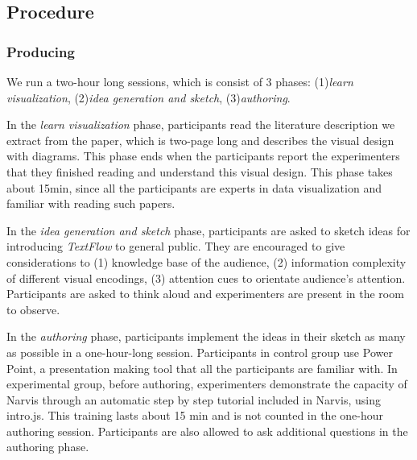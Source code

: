 \documentclass[review,journal]{vgtc}         %
\begin{document}
\subsection{Procedure}
\subsubsection{Producing}
We run a two-hour long sessions, which is consist of 3 phases: (1)\textit{learn visualization}, (2)\textit{idea generation and sketch}, (3)\textit{authoring}.\par
In the \textit{learn visualization} phase, participants read the literature description we extract from the paper, which is two-page long and describes the visual design with diagrams. This phase ends when the participants report the experimenters that they finished reading and understand this visual design. This phase takes about 15min, since all the participants are experts in data visualization and familiar with reading such papers.\par
In the \textit{idea generation and sketch} phase, participants are asked to sketch ideas for introducing \textit{TextFlow} to general public. They are encouraged to give considerations to (1) knowledge base of the audience, (2) information complexity of different visual encodings, (3) attention cues to orientate audience's attention. Participants are asked to think aloud and experimenters are present in the room to observe. \par
In the \textit{authoring} phase, participants implement the ideas in their sketch as many as possible in a one-hour-long session. Participants in control group use Power Point, a presentation making tool that all the participants are familiar with. In experimental group, before authoring, experimenters demonstrate the capacity of Narvis through an automatic step by step tutorial included in Narvis, using intro.js. This training lasts about 15 min and is not counted in the one-hour authoring session. Participants are also allowed to ask additional questions in the authoring phase.\par
\end{document}
